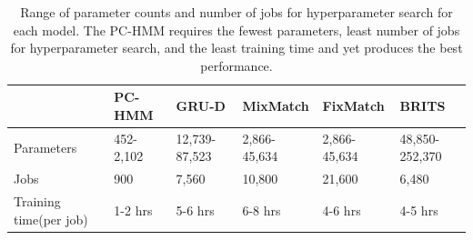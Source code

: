 \begin{table}[H]
\centering
\begin{tabular}{|l|l|l|l|l|l|}
\hline
     & PC-HMM & GRU-D & MixMatch  & FixMatch      & BRITS     \\
\hline
Parameters & 452-2,102  & 12,739-87,523   & 2,866-45,634  & 2,866-45,634  &  48,850-252,370     \\
\hline
Jobs & 900 & 7,560 & 10,800 & 21,600 &  6,480     \\
\hline
Training time(per job) & 1-2 hrs & 5-6 hrs & 6-8 hrs & 4-6 hrs &  4-5 hrs  \\
\hline
\end{tabular}
  \caption[Range of parameter counts and number of jobs for hyperparameter search per model]{Range of parameter counts and number of jobs for hyperparameter search for each model. The PC-HMM requires the fewest parameters, least number of jobs for hyperparameter search, and the least training time and yet produces the best performance.}
    \label{table: n_params}
\end{table}